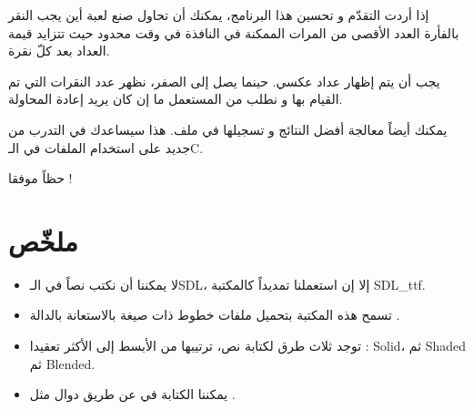 إذا أردت التقدّم و تحسين هذا البرنامج، يمكنك أن تحاول صنع لعبة أين يجب النقر بالفأرة العدد الأقصى من المرات الممكنة في النافذة في وقت محدود حيث تتزايد قيمة العداد بعد كلّ نقرة.

يجب أن يتم إظهار عداد عكسي. حينما يصل إلى الصفر، نظهر عدد النقرات التي تم القيام بها و نطلب من المستعمل ما إن كان يريد إعادة المحاولة.

يمكنك أيضاً معالجة أفضل النتائج و تسجيلها في ملف. هذا سيساعدك في التدرب من جديد على استخدام الملفات في الـ\textenglish{C}.

حظاً موفقا !

\section*{ملخّص}

\begin{itemize}
	\item لا يمكننا أن نكتب نصاً في الـ\textenglish{SDL}،
	إلا إن استعملنا تمديداً كالمكتبة 
	\textenglish{SDL\_ttf}.
	\item تسمح هذه المكتبة بتحميل ملفات خطوط ذات صيغة 
	بالاستعانة بالدالة
	.
	\item توجد ثلاث طرق لكتابة نص، ترتيبها من الأبسط إلى الأكثر تعقيدا :
	\textenglish{Solid}،
	ثم
	\textenglish{Shaded}
	ثم
	\textenglish{Blended}.
	\item يمكننا الكتابة في
	عن طريق دوال مثل
	.
\end{itemize}
